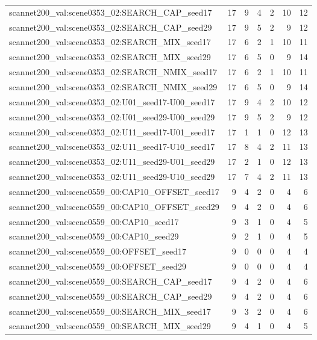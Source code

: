 \begin{table}[t]
\begin{tabular}{lrrrrrr}
scannet200\_val:scene0353\_02:SEARCH\_CAP\_seed17 & 17 & 9 & 4 & 2 & 10 & 12 \\
scannet200\_val:scene0353\_02:SEARCH\_CAP\_seed29 & 17 & 9 & 5 & 2 & 9 & 12 \\
scannet200\_val:scene0353\_02:SEARCH\_MIX\_seed17 & 17 & 6 & 2 & 1 & 10 & 11 \\
scannet200\_val:scene0353\_02:SEARCH\_MIX\_seed29 & 17 & 6 & 5 & 0 & 9 & 14 \\
scannet200\_val:scene0353\_02:SEARCH\_NMIX\_seed17 & 17 & 6 & 2 & 1 & 10 & 11 \\
scannet200\_val:scene0353\_02:SEARCH\_NMIX\_seed29 & 17 & 6 & 5 & 0 & 9 & 14 \\
scannet200\_val:scene0353\_02:U01\_seed17-U00\_seed17 & 17 & 9 & 4 & 2 & 10 & 12 \\
scannet200\_val:scene0353\_02:U01\_seed29-U00\_seed29 & 17 & 9 & 5 & 2 & 9 & 12 \\
scannet200\_val:scene0353\_02:U11\_seed17-U01\_seed17 & 17 & 1 & 1 & 0 & 12 & 13 \\
scannet200\_val:scene0353\_02:U11\_seed17-U10\_seed17 & 17 & 8 & 4 & 2 & 11 & 13 \\
scannet200\_val:scene0353\_02:U11\_seed29-U01\_seed29 & 17 & 2 & 1 & 0 & 12 & 13 \\
scannet200\_val:scene0353\_02:U11\_seed29-U10\_seed29 & 17 & 7 & 4 & 2 & 11 & 13 \\
scannet200\_val:scene0559\_00:CAP10\_OFFSET\_seed17 & 9 & 4 & 2 & 0 & 4 & 6 \\
scannet200\_val:scene0559\_00:CAP10\_OFFSET\_seed29 & 9 & 4 & 2 & 0 & 4 & 6 \\
scannet200\_val:scene0559\_00:CAP10\_seed17 & 9 & 3 & 1 & 0 & 4 & 5 \\
scannet200\_val:scene0559\_00:CAP10\_seed29 & 9 & 2 & 1 & 0 & 4 & 5 \\
scannet200\_val:scene0559\_00:OFFSET\_seed17 & 9 & 0 & 0 & 0 & 4 & 4 \\
scannet200\_val:scene0559\_00:OFFSET\_seed29 & 9 & 0 & 0 & 0 & 4 & 4 \\
scannet200\_val:scene0559\_00:SEARCH\_CAP\_seed17 & 9 & 4 & 2 & 0 & 4 & 6 \\
scannet200\_val:scene0559\_00:SEARCH\_CAP\_seed29 & 9 & 4 & 2 & 0 & 4 & 6 \\
scannet200\_val:scene0559\_00:SEARCH\_MIX\_seed17 & 9 & 3 & 2 & 0 & 4 & 6 \\
scannet200\_val:scene0559\_00:SEARCH\_MIX\_seed29 & 9 & 4 & 1 & 0 & 4 & 5 \\

\end{tabular}
\end{table}
